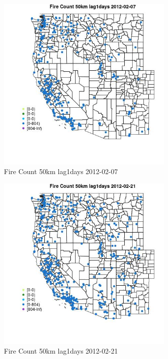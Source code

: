 \begin{figure} 
\centering  
\includegraphics[width=0.77\textwidth]{Code_Outputs/Report_ML_input_PM25_Step4_part_f_de_duplicated_aveswNAs_MapObsFire_Count_50km_lag1days2012-02-07.jpg} 
\caption{\label{fig:Report_ML_input_PM25_Step4_part_f_de_duplicated_aveswNAsMapObsFire_Count_50km_lag1days2012-02-07}Fire Count 50km lag1days 2012-02-07} 
\end{figure} 
 

\begin{figure} 
\centering  
\includegraphics[width=0.77\textwidth]{Code_Outputs/Report_ML_input_PM25_Step4_part_f_de_duplicated_aveswNAs_MapObsFire_Count_50km_lag1days2012-02-21.jpg} 
\caption{\label{fig:Report_ML_input_PM25_Step4_part_f_de_duplicated_aveswNAsMapObsFire_Count_50km_lag1days2012-02-21}Fire Count 50km lag1days 2012-02-21} 
\end{figure} 
 

